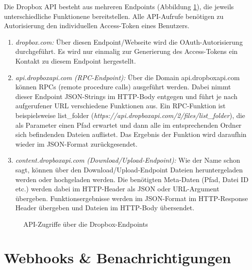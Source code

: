 Die Dropbox API besteht aus mehreren Endpoints (Abbildung \ref{04ergebnis:dpendpoints}), die jeweils unterschiedliche Funktionene bereitstellen. Alle API-Aufrufe benötigen zu Autorisierung den individuellen Access-Token eines Benutzers.

\begin{enumerate}
	\item \textit{dropbox.com:} Über diesen Endpoint/Webseite wird die OAuth-Autorisierung durchgeführt. Es wird nur einmalig zur Generierung des Access-Tokens ein Kontakt zu diesem Endpoint hergestellt.
	
	\item \textit{api.dropboxapi.com (RPC-Endpoint):}  Über die Domain api.dropboxapi.com können RPCs (remote procedure calls) ausgeführt werden. Dabei nimmt dieser Endpoint JSON-Strings im HTTP-Body entgegen und führt je nach aufgerufener URL verschiedene Funktionen aus. Ein RPC-Funktion ist beispielsweise list\_{folder} (\textit{https://api.dropboxapi.com/2/files/list\_{folder}}), die als Parameter einen Pfad erwartet und dann alle im entsprechenden Ordner sich
 befindenden Dateien auflistet. Das Ergebnis der Funktion wird daraufhin wieder im JSON-Format zurückgesendet.
 
 	\item \textit{content.dropboxapi.com (Download/Upload-Endpoint):} Wie der Name schon sagt, können über den Download/Upload-Endpoint Dateien heruntergeladen werden oder hochgeladen werden. Die benötigten Meta-Daten (Pfad, Datei ID etc.) werden dabei im HTTP-Header als JSON oder URL-Argument übergeben. Funktionsergebnisse werden im JSON-Format im HTTP-Response Header übergeben und Dateien im HTTP-Body übersendet.
\end{enumerate}

\begin{figure}[H]
\centering
	\scalebox{0.5}{}
	\caption{API-Zugriffe über die Dropbox-Endpoints}
	\label{04ergebnis:dpendpoints}	
\end{figure}

\section{Webhooks \& Benachrichtigungen}